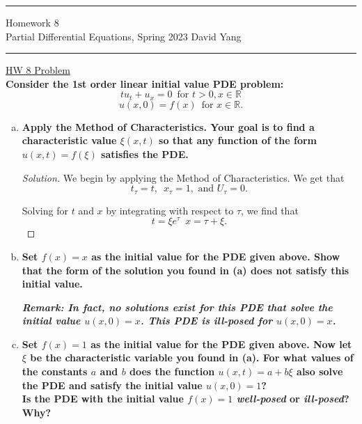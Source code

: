 \documentclass[11pt]{article}
\newenvironment{solution}
  {\renewcommand\qedsymbol{$\blacksquare$}\begin{proof}[Solution]}
  {\end{proof}}
\begin{document}
	\hrule
	\begin{center}
		{\Large Homework 8} \\ %
		\vspace{0.2cm}
		Partial Differential Equations, Spring 2023 \hfill David Yang %
	\end{center}

\hrule

\vspace{1em}


\underline{HW 8 Problem} \\

\textbf{Consider the 1st order linear initial value PDE problem:
\[tu_t + u_x = 0 \, \, \, \text{for } t > 0, x \in \mathbb{R}\]
\[ u(x, 0) = f(x) \, \, \, \text{for } x \in \mathbb{R}.\]}

\begin{enumerate}[(a)]
    \item \textbf{Apply the Method of Characteristics. Your goal is to find a characteristic value $\xi(x, t)$ so that any function of the form $u(x, t) = f(\xi)$ satisfies the PDE.}
    
    \begin{solution}
    We begin by applying the Method of Characteristics. We get that 
    \[ t_{\tau} = t, \, \, \, x_{\tau} = 1, \text{ and } U_{\tau} = 0.\]

    Solving for $t$ and $x$ by integrating with respect to $\tau$, we find that 
    \[ t = \xi e^{\tau} \, \, \, x = \tau + \xi.\]
    \end{solution}
    \item \textbf{Set $f(x) = x$ as the initial value for the PDE given above. Show that the form of the solution you found in (a) does not satisfy this initial value. \\}
    
    \textbf{\textit{Remark: In fact, no solutions exist for this PDE that solve the initial value $u(x, 0) = x$. This PDE is ill-posed for $u(x, 0) = x$.}}
    \item \textbf{Set $f(x) = 1$ as the initial value for the PDE given above. Now let $\xi$ be the characteristic variable you found in (a). 
    For what values of the constants $a$ and $b$ does the function $u(x, t) = a + b\xi$ also solve the PDE and satisfy the initial value $u(x,0) = 1$?}\\

    \textbf{Is the PDE with the initial value $f(x) = 1$ \textit{well-posed} or \textit{ill-posed}? Why?}
\end{enumerate}
\end{document}
